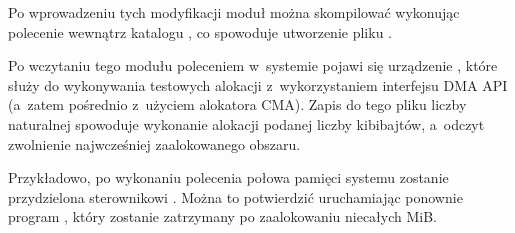 Po wprowadzeniu tych modyfikacji moduł można skompilować wykonując
polecenie  wewnątrz katalogu , co spowoduje
utworzenie pliku .

Po wczytaniu tego modułu poleceniem 
w~systemie pojawi się urządzenie , które służy do
wykonywania testowych alokacji z~wykorzystaniem interfejsu DMA API
(a~zatem pośrednio z~użyciem alokatora CMA).  Zapis do tego pliku
liczby naturalnej spowoduje wykonanie alokacji podanej liczby
kibibajtów, a~odczyt zwolnienie najwcześniej zaalokowanego obszaru.

Przykładowo, po wykonaniu polecenia 
połowa pamięci systemu zostanie przydzielona sterownikowi
.  Można to potwierdzić uruchamiając ponownie program
, który zostanie zatrzymany po zaalokowaniu niecałych
\unit[500]{MiB}.
